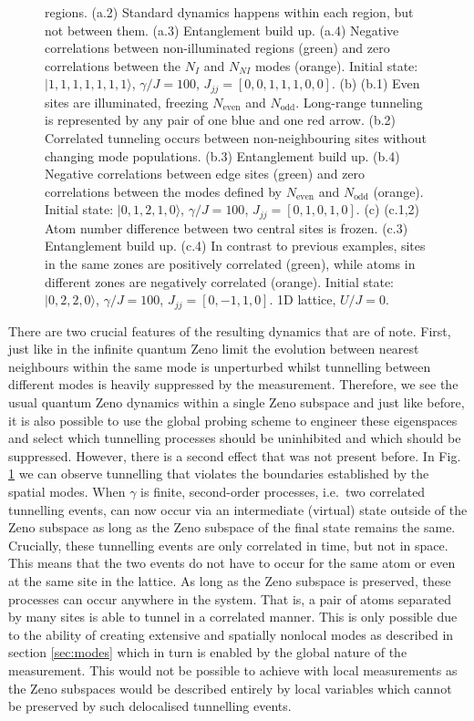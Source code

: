 \begin{figure}[hbtp!]
{    regions. (a.2) Standard dynamics happens within each region, but
    not between them. (a.3) Entanglement build up. (a.4) Negative
    correlations between non-illuminated regions (green) and zero
    correlations between the $N_I$ and $N_{NI}$ modes
    (orange). Initial state: $|1,1,1,1,1,1,1 \rangle$, $\gamma/J=100$,
    $J_{jj}=[0,0,1,1,1,0,0]$.  (b) (b.1) Even sites are illuminated,
    freezing $N_\text{even}$ and $N_\text{odd}$. Long-range tunneling
    is represented by any pair of one blue and one red arrow. (b.2)
    Correlated tunneling occurs between non-neighbouring sites without
    changing mode populations. (b.3) Entanglement build up. (b.4)
    Negative correlations between edge sites (green) and zero
    correlations between the modes defined by $N_\text{even}$ and
    $N_\text{odd}$ (orange). Initial state: $|0,1,2,1,0 \rangle$,
    $\gamma/J=100$, $J_{jj}=[0,1,0,1,0]$.  (c) (c.1,2) Atom number
    difference between two central sites is frozen. (c.3) Entanglement
    build up. (c.4) In contrast to previous examples, sites in the
    same zones are positively correlated (green), while atoms in
    different zones are negatively correlated (orange). Initial state:
    $|0,2,2,0 \rangle$, $\gamma/J=100$, $J_{jj}=[0,-1,1,0]$. 1D
    lattice, $U/J=0$.}
  \label{fig:zeno}
\end{figure}

There are two crucial features of the resulting dynamics that are of
note. First, just like in the infinite quantum Zeno limit the
evolution between nearest neighbours within the same mode is
unperturbed whilst tunnelling between different modes is heavily
suppressed by the measurement. Therefore, we see the usual quantum
Zeno dynamics within a single Zeno subspace and just like before, it
is also possible to use the global probing scheme to engineer these
eigenspaces and select which tunnelling processes should be
uninhibited and which should be suppressed. However, there is a second
effect that was not present before. In Fig. \ref{fig:zeno} we can
observe tunnelling that violates the boundaries established by the
spatial modes. When $\gamma$ is finite, second-order processes,
i.e.~two correlated tunnelling events, can now occur via an
intermediate (virtual) state outside of the Zeno subspace as long as
the Zeno subspace of the final state remains the same. Crucially,
these tunnelling events are only correlated in time, but not in
space. This means that the two events do not have to occur for the
same atom or even at the same site in the lattice. As long as the Zeno
subspace is preserved, these processes can occur anywhere in the
system. That is, a pair of atoms separated by many sites is able to
tunnel in a correlated manner. This is only possible due to the
ability of creating extensive and spatially nonlocal modes as
described in section \ref{sec:modes} which in turn is enabled by the
global nature of the measurement. This would not be possible to
achieve with local measurements as the Zeno subspaces would be
described entirely by local variables which cannot be preserved by
such delocalised tunnelling events.

